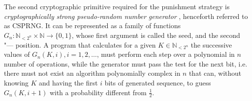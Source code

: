 The second cryptographic primitive required for the punishment strategy is \emph{cryptographically strong pseudo-random number generator} \cite{Gutmann}, henceforth referred to as CSPRNG. It can be represented as a family of functions $G_n : \mathbb{N}_{<2^n} \times \mathbb{N} \rightarrow \{0, 1\}$, whose first argument is called the seed, and the second "--- position. A program that calculates for a given $K \in \mathbb{N}_{<2^n}$ the successive values of $G_n(K, i), i = 1, 2, \ldots$, must perform each step over a polynomial in $n$ number of operations, while the generator must pass the test for the next bit, i.e. there must not exist an algorithm polynomially complex in $n$ that can, without knowing $K$ and having the first $i$ bits of generated sequence, to guess $G_n(K, i+1)$ with a probability different from $\frac{1}{2}$. %

